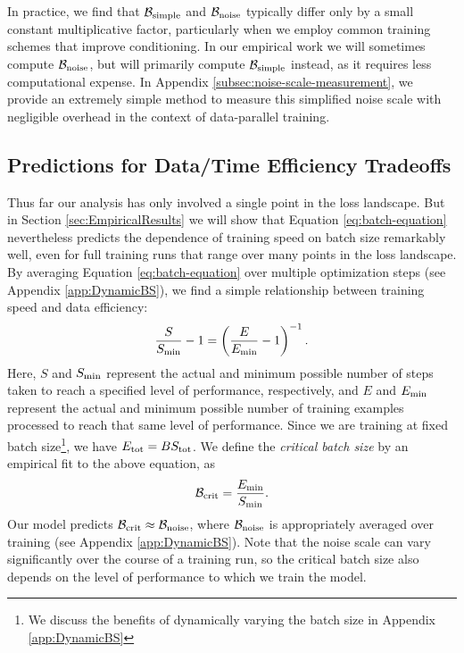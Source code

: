 \documentclass[english]{article}
\begin{document}
In practice, we find that $\mathcal{B}_{{\rm simple}}$ and $\mathcal{B}_{{\rm noise}}$ typically differ only by a small constant multiplicative factor, particularly when we employ common training schemes that improve conditioning. In our empirical work we will sometimes compute $\mathcal{B}_{{\rm noise}}$, but will primarily compute $\mathcal{B}_{{\rm simple}}$ instead, as it requires less computational expense.  In Appendix \ref{subsec:noise-scale-measurement}, we provide an extremely simple method to measure this simplified noise scale with negligible overhead in the context of data-parallel training.


\subsection{Predictions for Data/Time Efficiency Tradeoffs}

\label{sec:Efficiency}

Thus far our analysis has only involved a single point in the loss landscape.  But in Section \ref{sec:EmpiricalResults} we will show that Equation \ref{eq:batch-equation} nevertheless predicts the dependence of training speed on batch size remarkably well, even for full training runs that range over many points in the loss landscape.  By averaging Equation \ref{eq:batch-equation} over multiple optimization steps (see Appendix \ref{app:DynamicBS}), we find a simple relationship between training speed and data efficiency:
\begin{equation}
\frac{S}{S_{{\rm min}}}-1  =  \left(\frac{E}{E_{{\rm min}}}-1\right)^{-1}.\label{eq:tradeoff-eqn}
\end{equation}
Here, $S$ and $S_{{\rm min}}$ represent the actual and minimum possible number of steps taken to reach a specified level of performance, respectively, and $E$ and $E_{{\rm min}}$ represent the actual and minimum possible number of training examples processed to reach that same level of performance.  Since we are training at fixed batch size\footnote{We discuss the benefits of dynamically varying the batch size in Appendix \ref{app:DynamicBS}}, we have $E_{{\rm tot}} =B S_{{\rm tot}}$.  We define the \emph{critical batch size} by an empirical fit to the above equation, as
\begin{equation}
\mathcal{B}_{{\rm crit}} = \frac{E_{{\rm min}}}{S_{{\rm min}}}.
\end{equation}
Our model predicts  $\mathcal{B}_{{\rm crit}} \approx \mathcal{B}_{{\rm noise}}$, where $\mathcal{B}_{{\rm noise}}$ is appropriately averaged over training (see Appendix \ref{app:DynamicBS}).  Note that the noise scale can vary significantly over the course of a training run, so the critical batch size also depends on the level of performance to which we train the model.
\end{document}
